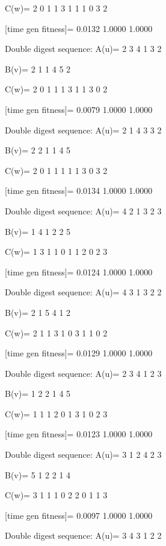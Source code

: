 C(w)=
     2     0     1     1     3     1     1     1     0     3     2

[time gen fitness]=
    0.0132    1.0000    1.0000

Double digest sequence:
A(u)=
     2     3     4     1     3     2

B(v)=
     2     1     1     4     5     2

C(w)=
     2     0     1     1     1     3     1     1     3     0     2

[time gen fitness]=
    0.0079    1.0000    1.0000

Double digest sequence:
A(u)=
     2     1     4     3     3     2

B(v)=
     2     2     1     1     4     5

C(w)=
     2     0     1     1     1     1     1     3     0     3     2

[time gen fitness]=
    0.0134    1.0000    1.0000

Double digest sequence:
A(u)=
     4     2     1     3     2     3

B(v)=
     1     4     1     2     2     5

C(w)=
     1     3     1     1     0     1     1     2     0     2     3

[time gen fitness]=
    0.0124    1.0000    1.0000

Double digest sequence:
A(u)=
     4     3     1     3     2     2

B(v)=
     2     1     5     4     1     2

C(w)=
     2     1     1     3     1     0     3     1     1     0     2

[time gen fitness]=
    0.0129    1.0000    1.0000

Double digest sequence:
A(u)=
     2     3     4     1     2     3

B(v)=
     1     2     2     1     4     5

C(w)=
     1     1     1     2     0     1     3     1     0     2     3

[time gen fitness]=
    0.0123    1.0000    1.0000

Double digest sequence:
A(u)=
     3     1     2     4     2     3

B(v)=
     5     1     2     2     1     4

C(w)=
     3     1     1     1     0     2     2     0     1     1     3

[time gen fitness]=
    0.0097    1.0000    1.0000

Double digest sequence:
A(u)=
     3     4     3     1     2     2

